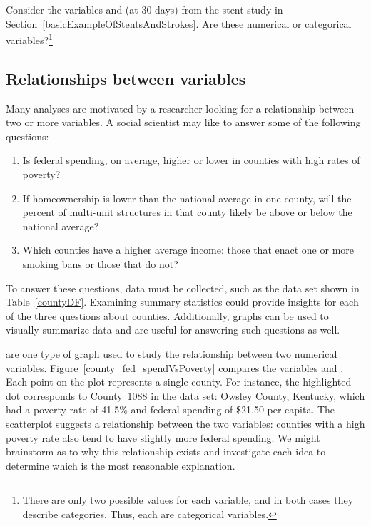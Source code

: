 \begin{exercise} 
Consider the variables  and  (at 30 days) from the stent study in Section~\ref{basicExampleOfStentsAndStrokes}. Are these numerical or categorical variables?\footnote{There are only two possible values for each variable, and in both cases they describe categories. Thus, each are categorical variables.}
\end{exercise}

\subsection{Relationships between variables}
\label{variableRelations}

Many analyses are motivated by a researcher looking for a relationship between two or more variables. A social scientist may like to answer some of the following questions:
\begin{enumerate}
\setlength{\itemsep}{0mm}
\item[(1)]\label{fedSpendingPovertyQuestion} Is federal spending, on average, higher or lower in counties with high rates of poverty?
\item[(2)]\label{ownershipMultiUnitQuestion} If homeownership is lower than the national average in one county, will the percent of multi-unit structures in that county likely be above or below the national average?
\item[(3)]\label{isAverageIncomeAssociatedWithSmokingBans} Which counties have a higher average income: those that enact one or more smoking bans or those that do not?
\end{enumerate}

To answer these questions, data must be collected, such as the  data set shown in Table~\ref{countyDF}. Examining summary statistics  could provide insights for each of the three questions about counties. Additionally, graphs can be used to visually summarize data and are useful for answering such questions as well.

 are one type of graph used to study the relationship between two numerical variables. Figure~\ref{county_fed_spendVsPoverty} compares the variables  and . Each point on the plot represents a single county. For instance, the highlighted dot corresponds to County~1088 in the  data set: Owsley County, Kentucky, which had a poverty rate of 41.5\% and federal spending of \$21.50 per capita. The scatterplot suggests a relationship between the two variables: counties with a high poverty rate also tend to have slightly more federal spending. We might brainstorm as to why this relationship exists and investigate each idea to determine which is the most reasonable explanation.

